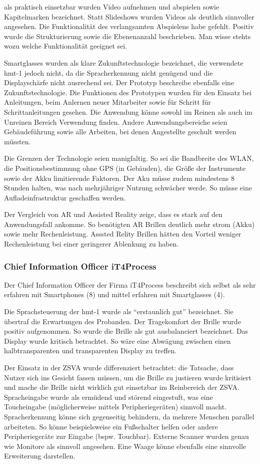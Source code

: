 als praktisch einsetzbar wurden Video aufnehmen und abspielen sowie Kapitelmarken bezeichnet. Statt Slideshows wurden Videos als deutlich sinnvoller angesehen. Die Funktionalität des verlangsamten Abspielens habe gefehlt. Positiv wurde die Strukturierung sowie die Ebenenanzahl beschrieben. Man wisse stehts wozu welche Funktionalität geeignet sei.

Smartglasses wurden als klare Zukunftstechnologie bezeichnet, die verwendete hmt-1 jedoch nicht, da die Spracherkennung nicht genügend und die Displayschärfe nicht ausrechend sei. Der Prototyp beschreibe ebenfalls eine Zukunftstechnologie. Die Funktionen des Prototypen wurden für den Einsatz bei Anleitungen, beim Anlernen neuer Mitarbeiter sowie für Schritt für Schrittanleitungen gesehen. Die Anwendung könne sowohl im Reinen als auch im Unreinen Bereich Verwendung finden. Andere Anwendungsbereiche seien Gebäudeführung sowie alle Arbeiten, bei denen Angestellte geschult werden müssten. 

Die Grenzen der Technologie seien manigfaltig. So sei die Bandbreite des WLAN, die Positionsbestimmung ohne GPS (in Gebäuden), die Größe der Instrumente sowie der Akku limitierende Faktoren. Der Aku müsse zudem mindestens 8 Stunden halten, was nach mehrjähriger Nutzung schwächer werde. So müsse eine Aufladeinfrastruktur geschaffen werden.

Der Vergleich von AR und Assisted Reality zeige, dass es stark auf den Anwendungsfall ankomme. So benötigten AR Brillen deutlich mehr strom (Akku) sowie mehr Rechenleistung. Asssted Relity Brillen hätten den Vorteil weniger Rechenleistung bei einer geringerer Ablenkung zu haben.
%
%
\subsubsection{Chief Information Officer iT4Process}
Der Chief Information Officer der Firma iT4Process beschreibt sich selbst als sehr erfahren mit Smartphones (8) und mittel erfahren mit Smartglasses (4).

Die Sprachsteuerung der hmt-1 wurde als \enquote{erstaunlich gut} bezeichnet. Sie übertraf die Erwartungen des Probanden. Der Tragekomfort der Brille wurde positiv aufgenommen. So wurde die Brille als gut ausbalanciert bezeichnet. Das Display wurde kritisch betrachtet. So wäre eine Abwägung zwischen einen halbtransparenten und transparenten Display zu treffen. 

Der Einsatz in der ZSVA wurde differenziert betrachtet: die Tatsache, dass Nutzer sich ins Gesicht fassen müssen, um die Brille zu justieren wurde kritisiert und mache die Brille nicht wirklich gut einsetzbar im Reinbereich der ZSVA. Spracheingabe wurde als ermüdend und störend eingestuft, was eine Toucheingabe (möglicherweise mittels Peripheriegeräten) sinnvoll macht. Spracherkennung könne sich gegenseitig behindern, da mehrere Menschen parallel arbeiteten. So könne beispielsweise ein Fußschalter helfen oder andere Peripheriegeräte zur Eingabe (bspw. Touchbar). Externe Scanner wurden genau wie Monitore als sinnvoll angesehen. Eine Waage könne ebenfalls eine sinnvolle Erweiterung darstellen.


